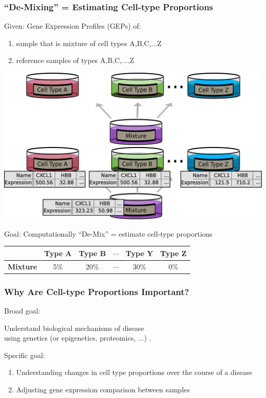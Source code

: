 \documentclass[usenames,dvipsnames,15pt]{beamer}
\renewcommand{\alert}[1]{{\color{NavyBlue} #1}}
\begin{document}
\begin{frame}
  \frametitle{``De-Mixing'' = Estimating Cell-type Proportions}
  \alert{\large Given:} Gene Expression Profiles (GEPs) of:
  \begin{enumerate}
  \item sample that is mixture of cell types A,B,C,...Z
  \item reference samples of types A,B,C,...,Z\\
  \end{enumerate}
  \hspace{1cm}\begin{center}
    \begin{overprint}
      \hspace{-.75cm}\includegraphics[scale=.28]{pictures/mixture_cartoon}
      \hspace*{-.77cm}\includegraphics[scale=.28]{pictures/mixture_cartoon_data}
    \end{overprint}
  \end{center}
  \alert{\large Goal:} Computationally ``De-Mix'' = estimate cell-type proportions
  {\scriptsize \begin{center}\begin{tabular}{c||c|c|c|c|c}
      & \bf Type A& \bf Type B& $\cdots$& \bf Type Y&\bf  Type Z\\\hline\hline
    \bf Mixture& 5\%& 20\%& $\cdots$& 30\%& 0\%
  \end{tabular}\end{center}}
\end{frame}

\begin{frame}
  \frametitle{Why Are Cell-type Proportions Important?}
    {\Large\alert{ Broad goal:}\\\begin{center} Understand biological mechanisms of disease\\ using \alert{genetics} (or epigenetics, proteomics, ...) .\end{center}}
    {\Large\alert{ Specific goal:}}
    \begin{enumerate}
    \item Understanding changes in cell type proportions over the course of a disease
    \item Adjusting gene expression comparison between samples
    \end{enumerate}
\end{frame}
\end{document}
